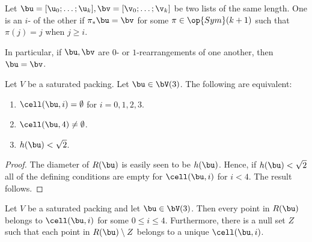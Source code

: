 \bigskip

\begin{definition}[$i$-rearrangement] 
Let $\bu=[\u_0;\ldots;\u_k],\bv=[\v_0;\ldots;\v_k]$ be two lists of the same length.  
One is an
 $i$- of the other if
$\pi_*\bu = \bv$ for some $\pi\in\op{Sym}(k+1)$ such
that 
$\pi(j) = j$  when $j \ge i$.
\end{definition}

In particular, if $\bu,\bv$ are $0$- or $1$-rearrangements of one another,
then $\bu = \bv$.


\begin{lemma}[]\label{lemma:M-complement4} 
Let $V$ be a saturated packing.  Let $\bu\in \bV(3)$.
The following are equivalent:
\begin{enumerate} 
\item  $\cell(\bu,i)=\emptyset$ for $i=0,1,2,3$.
\item  $\cell(\bu,4)\ne\emptyset$.
\item  $h(\bu)<\sqrt2$.
\end{enumerate}
\end{lemma}

\begin{proof} 
The diameter of $R(\bu)$ is easily seen to be $h(\bu)$.  Hence, if $h(\bu)<\sqrt2$
all of the defining conditions are empty for $\cell(\bu,i)$ for $i<4$.  The result follows.
\end{proof}

\begin{lemma}[]\label{lemma:M-exhaust} 
Let $V$ be a saturated packing and let $\bu\in \bV(3)$. Then
every point in $R(\bu)$ 
belongs to $\cell(\bu,i)$  for some $0\le i\le 4$.  Furthermore, there is a null set  
$Z$ such that each point in $R(\bu)\setminus Z$ belongs to a unique
$\cell(\bu,i)$.
\end{lemma}

